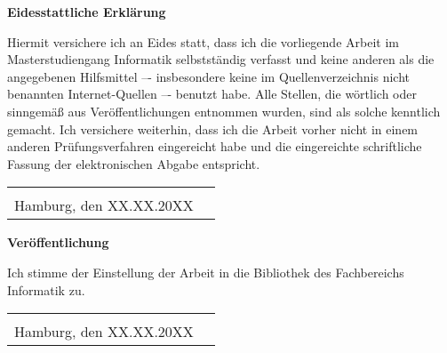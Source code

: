 
\clearpage
\thispagestyle{empty}
\pagestyle{empty}

\begin{center}
	\Large
	\textbf{Eidesstattliche Erklärung}
\end{center}
\noindent
Hiermit versichere ich an Eides statt, dass ich die vorliegende Arbeit im Masterstudiengang Informatik selbstständig verfasst und keine anderen als die angegebenen Hilfsmittel –- insbesondere keine im Quellenverzeichnis nicht benannten Internet-Quellen –- benutzt habe. Alle Stellen, die wörtlich oder sinngemäß aus Veröffentlichungen entnommen wurden, sind als solche kenntlich gemacht. Ich versichere weiterhin, dass ich die Arbeit vorher nicht in einem anderen Prüfungsverfahren eingereicht habe und die eingereichte schriftliche Fassung der elektronischen Abgabe entspricht.

\vspace*{1cm}
\noindent
\begin{tabularx}{\textwidth}{@{}Xr@{}}
	&
	\begin{tabular}{@{}l@{}}
		\makebox[5cm]{}\\ %
		\hline
	\end{tabular}
	\\
	\noindent
	Hamburg, den XX.XX.20XX
	&
	\makebox[5cm]{Hauke Stieler}
\end{tabularx}

\vspace*{3cm}

\begin{center}
	\Large
	\textbf{Veröffentlichung}
\end{center}
\noindent
Ich stimme der Einstellung der Arbeit in die Bibliothek des Fachbereichs Informatik zu.

\vspace*{1cm}
\noindent
\begin{tabularx}{\textwidth}{@{}Xr@{}}
	&
	\begin{tabular}{@{}l@{}}
		\makebox[5cm]{}\\ %
		\hline
	\end{tabular}
	\\
	\noindent
	Hamburg, den XX.XX.20XX
	&
	\makebox[5cm]{Hauke Stieler}
\end{tabularx}